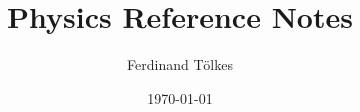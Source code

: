 \documentclass[12pt]{article}
\title{Physics Reference Notes}
\author{Ferdinand Tölkes}
\date{\today}
\begin{document}
\sloppy

\maketitle
\tableofcontents

\newpage


\newpage

\newpage

\newpage

\newpage

\newpage

\newpage

\newpage

\newpage

\newpage

\newpage

\newpage

\newpage

\newpage
\end{document}
